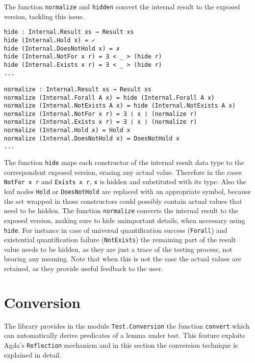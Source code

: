 \documentclass[10pt,a4paper]{article}
\begin{document}
The function \texttt{normalize} and \texttt{hidden} convert the internal result to the exposed version, tackling this issue.

\begin{verbatim}
hide : Internal.Result xs → Result xs
hide (Internal.Hold x) = ✓
hide (Internal.DoesNotHold x) = ✗
hide (Internal.NotFor x r) = ∃ < _ > (hide r)
hide (Internal.Exists x r) = ∃ < _ > (hide r)
...

normalize : Internal.Result xs → Result xs
normalize (Internal.Forall A x) = hide (Internal.Forall A x)
normalize (Internal.NotExists A x) = hide (Internal.NotExists A x)
normalize (Internal.NotFor x r) = ∃ ⟨ x ⟩ (normalize r)
normalize (Internal.Exists x r) = ∃ ⟨ x ⟩ (normalize r)
normalize (Internal.Hold x) = Hold x
normalize (Internal.DoesNotHold x) = DoesNotHold x
...
\end{verbatim}
The function \texttt{hide} maps each constructor of the internal result data type to the correspondent exposed version, erasing any actual value.
Therefore in the cases \texttt{NotFor x r} and \texttt{Exists x r}, \texttt{x} is hidden and substituted with its type. 
Also the leaf nodes \texttt{Hold} or \texttt{DoesNotHold} are replaced with an appropriate symbol, because the set wrapped in those constructors could possibly contain actual values that need to be hidden.
The function \texttt{normalize} converts the internal result to the exposed version, making sure to hide unimportant details, when necessary using \texttt{hide}. For instance in case of universal quantification success (\texttt{Forall}) and existential quantification failure (\texttt{NotExists}) the remaining part of the result value needs to be hidden, as they are just a trace of the testing process, not bearing any meaning.
Note that when this is not the case the actual values are retained, as they provide useful feedback to the user.


\section{Conversion}
The library provides in the module \texttt{Test.Conversion} the function \texttt{convert} which can automatically derive predicates of a lemma under test. 
This feature exploits Agda's \texttt{Reflection} mechanism and in this section the conversion technique is explained in detail.
\end{document}
